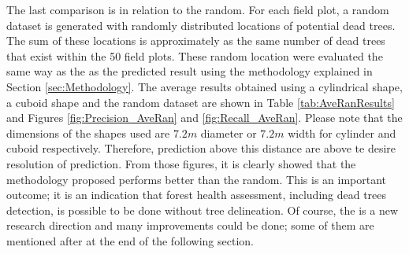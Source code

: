 \documentclass{subfiles}
\begin{document}
        \newpage
        \par The last comparison is in relation to the random. For each field plot, a random dataset is generated with randomly distributed locations of potential dead trees. The sum of these locations is approximately as the same number of dead trees that exist within the 50 field plots. These random location were evaluated the same way as the as the predicted result using the methodology explained in Section \ref{sec:Methodology}. The average results obtained using a cylindrical shape, a cuboid shape and the random dataset are shown in Table \ref{tab:AveRanResults} and Figures \ref{fig:Precision_AveRan} and \ref{fig:Recall_AveRan}. Please note that the dimensions of the shapes used are $7.2m$ diameter or $7.2m$ width for cylinder and cuboid respectively. Therefore, prediction above this distance are above te desire resolution of prediction. From those figures, it is clearly showed that the methodology proposed performs better than the random. This is an important outcome; it is an indication that forest health assessment, including dead trees detection, is possible to be done without tree delineation. Of course, the is a new research direction and many improvements could be done; some of them are mentioned after at the end of the following section. 
    
\end{document}
